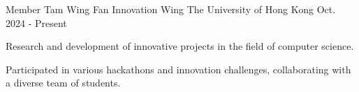 

\begin{cventries}

\cventry
  {Member} %
  {Tam Wing Fan Innovation Wing} %
  {The University of Hong Kong} %
  {Oct. 2024 - Present} %
  {
    \begin{cvitems} %
      \item {Research and development of innovative projects in the field of computer science.}
      \item {Participated in various hackathons and innovation challenges, collaborating with a diverse team of students.}
    \end{cvitems}
  }


\end{cventries}
